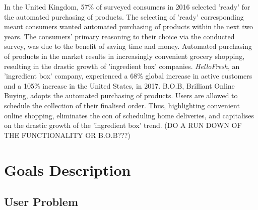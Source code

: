 \documentclass[12pt]{article}
\begin{document}
In the United Kingdom, 57\% of surveyed consumers in 2016 selected 'ready' for the automated purchasing of products. The selecting of 'ready' corresponding meant consumers wanted automated purchasing of products within the next two years. 
\newline\newline
The consumers' primary reasoning to their choice via the conducted survey, was due to the benefit of saving time and money. Automated purchasing of products in the market results in increasingly convenient grocery shopping, resulting in the drastic growth of 'ingredient box' companies.
\newline\newline
\textit{HelloFresh}, an 'ingredient box' company, experienced a 68\% global increase in active customers and a 105\% increase in the United States, in 2017.
\newline\newline
B.O.B, Brilliant Online Buying, adopts the automated purchasing of products. Users are allowed to schedule the collection of their finalised order. Thus, highlighting convenient online shopping, eliminates the con of scheduling home deliveries, and capitalises on the drastic growth of the 'ingredient box' trend.
\newline\newline
(DO A RUN DOWN OF THE FUNCTIONALITY OR B.O.B???)

\section*{Goals Description}

\subsection*{User Problem}
\end{document}

